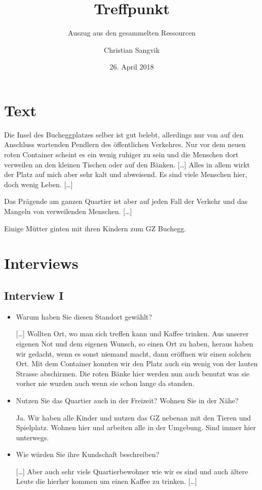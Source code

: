 \documentclass[a4paper,ngerman,11pt]{scrartcl}
\subtitle{Auszug aus den gesammelten Ressourcen}
\author{Christian Sangvik}
\date{26. April 2018}
\title{Treffpunkt}
\begin{document}
\maketitle

\section*{Text}
\label{sec-1}

Die Insel des Bucheggplatzes selber ist gut belebt, allerdings nur von auf den
Anschluss wartenden Pendlern des öffentlichen Verkehres. Nur vor dem neuen
roten Container scheint es ein wenig ruhiger zu sein und die Menschen dort
verweilen an den kleinen Tischen oder auf den Bänken. [\ldots{}]  Alles in allem
wirkt der Platz auf mich aber sehr kalt und abweisend. Es sind viele Menschen
hier, doch wenig Leben. [\ldots{}]

Das Prägende am ganzen Quartier ist aber auf jeden Fall der Verkehr und das
Mangeln von verweilenden Menschen. [\ldots{}]

Einige Mütter ginten mit ihren Kindern zum GZ Buchegg.

\section*{Interviews}
\label{sec-2}

\subsection*{Interview I}
\label{sec-2-1}

\begin{itemize}
\item Warum haben Sie diesen Standort gewählt?

[\ldots{}] Wollten Ort, wo man sich treffen kann und Kaffee trinken. Aus unserer
eigenen Not und dem eigenen Wunsch, so einen Ort zu haben, heraus haben wir
gedacht, wenn es sonst niemand macht, dann eröffnen wir einen solchen Ort.
Mit dem Container konnten wir den Platz auch ein wenig von der lauten
Strasse abschirmen. Die roten Bänke hier werden nun auch benutzt was sie
vorher nie wurden auch wenn sie schon lange da standen.

\item Nutzen Sie das Quartier auch in der Freizeit? Wohnen Sie in der Nähe?

Ja. Wir haben alle Kinder und nutzen das GZ nebenan mit den Tieren und
Spielplatz. Wohnen hier und arbeiten alle in der Umgebung. Sind immer hier
unterwegs.

\item Wie würden Sie ihre Kundschaft beschreiben?

[\ldots{}] Aber auch sehr viele Quartierbewohner wie wir es sind und auch ältere
Leute die hierher kommen um einen Kaffee zu trinken. [\ldots{}]
\end{itemize}
\end{document}

